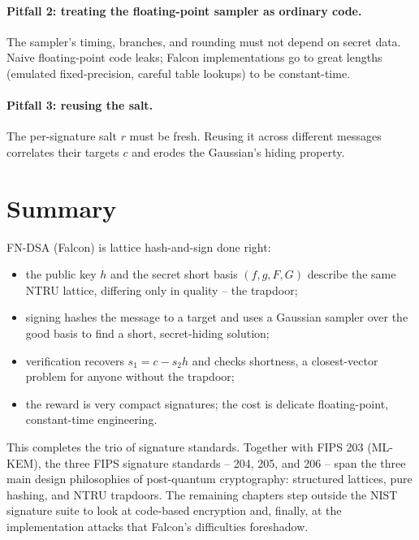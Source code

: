 \paragraph{Pitfall 2: treating the floating-point sampler as ordinary code.}
The sampler's timing, branches, and rounding must not depend on secret data. Naive floating-point code leaks; Falcon implementations go to great lengths (emulated fixed-precision, careful table lookups) to be constant-time.

\paragraph{Pitfall 3: reusing the salt.}
The per-signature salt $r$ must be fresh. Reusing it across different messages correlates their targets $c$ and erodes the Gaussian's hiding property.

\section{Summary}

FN-DSA (Falcon) is lattice hash-and-sign done right:

\begin{itemize}
  \item the public key $h$ and the secret short basis $(f,g,F,G)$ describe the same NTRU lattice, differing only in quality -- the trapdoor;
  \item signing hashes the message to a target and uses a Gaussian sampler over the good basis to find a short, secret-hiding solution;
  \item verification recovers $s_1=c-s_2 h$ and checks shortness, a closest-vector problem for anyone without the trapdoor;
  \item the reward is very compact signatures; the cost is delicate floating-point, constant-time engineering.
\end{itemize}

This completes the trio of signature standards. Together with FIPS 203 (ML-KEM), the three FIPS signature standards -- 204, 205, and 206 -- span the three main design philosophies of post-quantum cryptography: structured lattices, pure hashing, and NTRU trapdoors. The remaining chapters step outside the NIST signature suite to look at code-based encryption and, finally, at the implementation attacks that Falcon's difficulties foreshadow.
